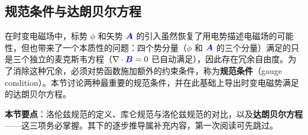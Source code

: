 \documentclass[11pt,a4paper,openany,oneside]{book}
\newcommand{\vecB}{\textcolor{blue}{\vect{B}}}
\newcommand{\vecA}{\textcolor{blue!70!black}{\vect{A}}}
\newcommand{\vect}[1]{\bm{#1}}
\newcommand{\divg}{\nabla\cdot}
\begin{document}
\subsection{规范条件与达朗贝尔方程}

在时变电磁场中，标势 $\phi$ 和矢势 $\vecA$ 的引入虽然恢复了用电势描述电磁场的可能性，但也带来了一个本质性的问题：四个势分量（$\phi$ 和 $\vecA$ 的三个分量）满足的只是三个独立的麦克斯韦方程（$\divg\vecB=0$ 已自动满足），因此存在冗余自由度。为了消除这种冗余，必须对势函数施加额外的约束条件，称为\textbf{规范条件}（gauge condition）。本节讨论两种最重要的规范条件，并在此基础上导出时变电磁势满足的达朗贝尔方程。

\noindent\textbf{本节要点}：洛伦兹规范的定义、库仑规范与洛伦兹规范的对比，以及\textbf{达朗贝尔方程}——这三项务必掌握。其下的逐步推导属补充内容，第一次阅读可先跳过。
\end{document}

